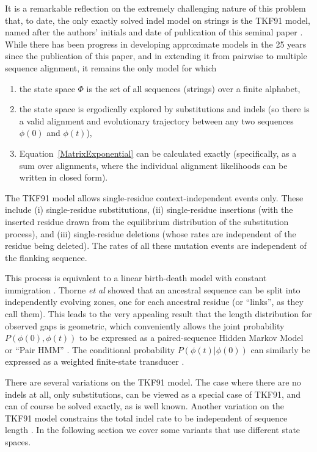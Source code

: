 \documentclass{bmcart}
\newcommand{\eqref}[1]{Equation~\ref{#1}}
\newcommand{\statespace}{\Phi}
\newcommand{\state}{\phi}
\begin{document}
It is a remarkable reflection on the extremely challenging nature of this problem
that, to date, the only exactly solved indel model on strings
is the TKF91 model, named after the authors' initials and date of publication
of this seminal paper \cite{ThorneEtal91}.
While there has been progress in developing approximate models in the 25 years since the publication of this paper,
and in extending it from pairwise to multiple sequence alignment,
it remains the only model for which
\begin{enumerate}
\item the state space $\statespace$ is the set of all sequences (strings) over a finite alphabet,
\item the state space is ergodically explored by substitutions and indels
(so there is a valid alignment and evolutionary trajectory between any two sequences $\state(0)$ and $\state(t)$),
\item \eqref{MatrixExponential} can be calculated exactly
 (specifically, as a sum over alignments,
  where the individual alignment likelihoods can be written in closed form).
\end{enumerate}

The TKF91 model allows single-residue context-independent events only.
These include (i) single-residue substitutions,
(ii) single-residue insertions (with the inserted residue drawn from the equilibrium distribution
of the substitution process), and
(iii) single-residue deletions (whose rates are independent of the residue being deleted).
The rates of all these mutation events are independent of the flanking sequence.

This process is equivalent to a linear birth-death model with constant immigration
\cite{Feller71}.
Thorne {\em et al} showed that 
an ancestral sequence can be split into independently evolving zones, one for each ancestral residue
(or ``links'', as they call them).
This leads to the very appealing result that the length distribution for observed gaps is geometric,
which conveniently allows the joint probability $P(\state(0),\state(t))$ to be expressed
as a paired-sequence Hidden Markov Model or ``Pair HMM'' \cite{HolmesBruno2001}.
The conditional probability $P(\state(t)|\state(0))$
can similarly be expressed as a weighted finite-state transducer \cite{Holmes2003,WestessonEtAl2012,BouchardCote2013}.

There are several variations on the TKF91 model.
The case where there are no indels at all, only substitutions, can be viewed as a special case of TKF91,
and can of course be solved exactly, as is well known.
Another variation on the TKF91 model constrains the total indel rate to be independent of sequence
length \cite{BouchardCoteJordan2013}.
In the following section we cover some variants that use different state spaces.
\end{document}
